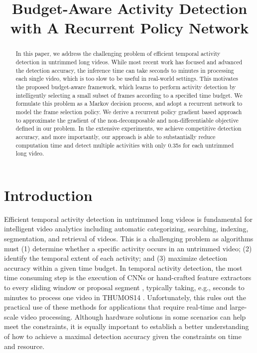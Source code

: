 \documentclass{bmvc2k}
\title{Budget-Aware Activity Detection with A Recurrent Policy Network}
\begin{document}
\maketitle

\begin{abstract}
In this paper, we address the challenging problem of efficient temporal activity detection in untrimmed long videos. While most recent work has focused and advanced the detection accuracy, the inference time can take seconds to minutes in processing each single video, which is too slow to be useful in real-world settings. This motivates the proposed budget-aware framework, which learns to perform activity detection by intelligently selecting a small subset of frames according to a specified time budget. We formulate this problem as a Markov decision process, and adopt a recurrent network to model the frame selection policy. We derive a recurrent policy gradient based approach to approximate the gradient of the non-decomposable and non-differentiable objective defined in our problem. In the extensive experiments, we achieve competitive detection accuracy, and more importantly, our approach is able to substantially reduce computation time and detect multiple activities with only 0.35s for each untrimmed long video.
\end{abstract}

\section{Introduction}
\label{sec:introduction}

Efficient temporal activity detection in untrimmed long videos is fundamental for intelligent video analytics including automatic categorizing, searching, indexing, segmentation, and retrieval of videos. This is a challenging problem as algorithms must (1) determine whether a specific activity occurs in an untrimmed video; (2) identify the temporal extent of each activity; and (3) maximize detection accuracy within a given time budget. In temporal activity detection, the most time consuming step is the execution of CNNs or hand-crafted feature extractors to every sliding window or proposal segment \cite{daps, fast-proposal, score-pyramid}, typically taking, e.g., seconds to minutes to process one video in THUMOS14 \cite{THUMOS14}. Unfortunately, this rules out the practical use of these methods for applications that require real-time and large-scale video processing. Although hardware solutions in some scenarios can help meet the constraints, it is equally important to establish a better understanding of how to achieve a maximal detection accuracy given the constraints on time and resource.
\end{document}
